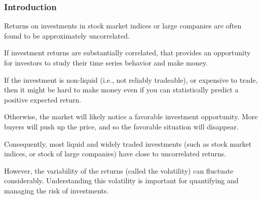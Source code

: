 \documentclass{beamer}
\begin{document}
\begin{frame}[fragile]

\frametitle{Introduction}

\bi

\item Returns on investments in stock market indices or large companies are often found to be approximately uncorrelated. 

\item If investment returns are substantially correlated, that provides an opportunity for investors to study their time series behavior and make money. 

\item If the investment is non-liquid (i.e., not reliably tradeable), or expensive to trade, then it might be hard to make money even if you can statistically predict a positive expected return.

\item Otherwise, the market will likely notice a favorable investment opportunity. More buyers will push up the price, and so the favorable situation will disappear.

\item Consequently, most liquid and widely traded investments (such as stock market indices, or stock of large companies) have close to uncorrelated returns.

\item However, the variability of the returns (called the volatility) can fluctuate considerably. Understanding this volatility is important for quantifying and managing the risk of investments. 

\ei

\end{frame}
\end{document}
